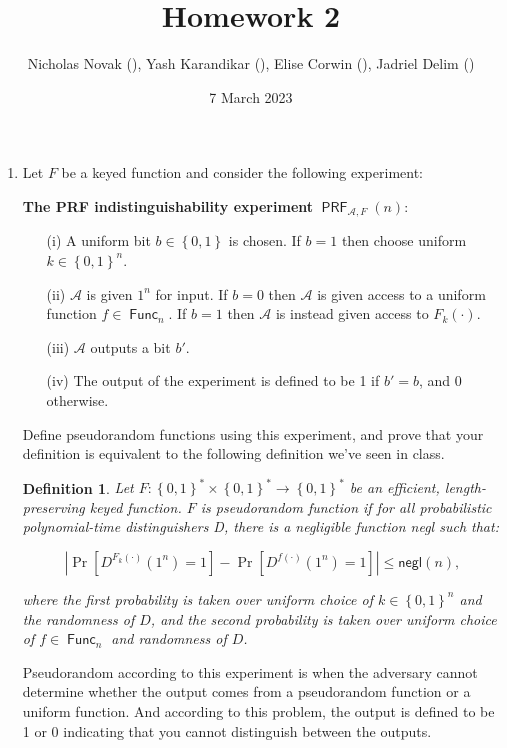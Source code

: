 \documentclass{article}
\title{Homework 2}
\date{7 March 2023}
\author{Nicholas Novak (), Yash Karandikar (),
Elise Corwin (), Jadriel Delim ()}
\newtheorem{definition}{Definition}
\DeclareMathOperator{\PRF}{\textsf{PRF}}
\DeclareMathOperator{\Func}{\textsf{Func}}
\begin{document}
\maketitle

\begin{enumerate}
  \item Let $F$ be a keyed function and consider the following experiment:

    \textbf{The PRF indistinguishability experiment} $\PRF_{\mathcal{A},
    F}(n)$:

    \begin{enumerate}
      \item[(i)] A uniform bit $b \in \left\{0, 1\right\}$ is chosen. If $b = 1$ then
        choose uniform $k \in \left\{0, 1\right\}^n$.
      \item[(ii)] $\mathcal{A}$ is given $1^n$ for input. If $b = 0$ then
        $\mathcal{A}$ is given access to a uniform function $f \in
        \Func_n$. If $b = 1$ then $\mathcal{A}$ is instead given access to
        $F_k(\cdot)$.
      \item[(iii)] $\mathcal{A}$ outputs a bit $b'$.
      \item[(iv)] The output of the experiment is defined to be 1 if $b' = b$, and $0$
        otherwise.
    \end{enumerate}

    Define pseudorandom functions using this experiment, and prove that your
    definition is equivalent to the following definition we've seen in class.

    \begin{definition}
      Let $F : \left\{0, 1\right\}^* \times \left\{0, 1\right\}^* \to \left\{0,
      1\right\}^*$ \textit{be an efficient, length-preserving keyed function.}
      $F$ \textit{is \textsf{pseudorandom function} if for all probabilistic
        polynomial-time distinguishers D, there is a negligible function
      \textsf{negl} such that:}

      \[
        \left| \Pr\left[D^{F_k(\cdot)}(1^n) = 1\right] -
      \Pr\left[D^{f(\cdot)}(1^n) = 1\right] \right| \leq \textsf{negl}(n),
      \]

      \textit{where the first probability is taken over uniform choice of $k \in
        \left\{0, 1\right\}^n$ and the randomness of $D$, and the second
        probability is taken over uniform choice of $f \in \Func_n$ and
      randomness of $D$.}
    \end{definition}

    Pseudorandom according to this experiment is when the adversary cannot determine 
    whether the output comes from a pseudorandom function or a uniform function. And according
    to this problem, the output is defined to be 1 or 0 indicating that you cannot distinguish between the outputs. 
    

\end{enumerate}
\end{document}
